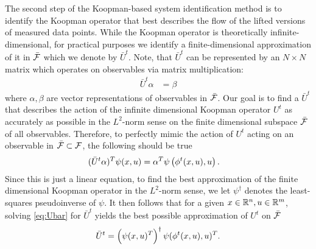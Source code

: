 The second step of the Koopman-based system identification method is to identify the Koopman operator that best describes the flow of the lifted versions of measured data points.
While the Koopman operator is theoretically infinite-dimensional, for practical purposes we identify a finite-dimensional approximation of it in $\bar{\mathcal{F}}$ which we denote by $\bar{U}^t$.
Note, that $\bar{U}^t$ can be represented by an $N \times N$ matrix which operates on observables via matrix multiplication:
\begin{align}
    \bar{U}^t {\alpha} &= {\beta} 
    \label{eq:Ubar}
\end{align}
where $\alpha, \beta$ are vector representations of observables in $\bar{\mathcal{F}}$.
Our goal is to find a $\bar{U}^t$ that describes the action of the infinite dimensional Koopman operator $U^t$ as accurately as possible in the $L^2$-norm sense on the finite dimensional subspace $\bar{\mathcal{F}}$  of all observables.
Therefore, to perfectly mimic the action of $U^t$ acting on an observable in $\bar{\mathcal{F}} \subset \mathcal{F}$, the following should be true
\begin{align}
    ( \bar{U}^t {\alpha} )^T {\psi}(x, u) &=
    {\alpha}^T {\psi} \left( \phi^t(x,u), u \right).
    \label{eq:Ubar}
\end{align}
Since this is just a linear equation, to find the best approximation of the finite dimensional Koopman operator in the $L^2$-norm sense, we let  ${\psi}^\dagger$ denotes the least-squares pseudoinverse of ${\psi}$.
It then follows that for a given ${x \in \mathbb{R}^n, u \in \mathbb{R}^m}$, solving \eqref{eq:Ubar} for $\bar{U}^t$ yields the best possible approximation of $U^t$ on $\bar{\mathcal{F}}$
\begin{align}
    \bar{U}^t = \left( {\psi}(x, u)^T \right)^\dagger {\psi}( \phi^t(x,u), u )^T.
    \label{eq:Uapprox}
\end{align}

